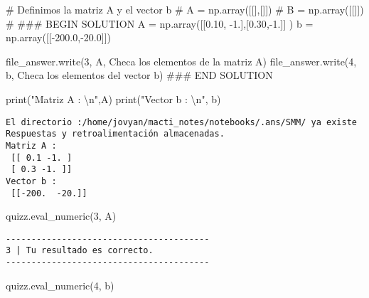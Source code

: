 \documentclass[
  letterpaper,
  DIV=11,
  numbers=noendperiod]{scrreprt}
\newenvironment{Shaded}{\begin{snugshade}}{\end{snugshade}}
\newcommand{\BuiltInTok}[1]{\textcolor[rgb]{0.00,0.23,0.31}{#1}}
\newcommand{\CharTok}[1]{\textcolor[rgb]{0.13,0.47,0.30}{#1}}
\newcommand{\CommentTok}[1]{\textcolor[rgb]{0.37,0.37,0.37}{#1}}
\newcommand{\FloatTok}[1]{\textcolor[rgb]{0.68,0.00,0.00}{#1}}
\newcommand{\NormalTok}[1]{\textcolor[rgb]{0.00,0.23,0.31}{#1}}
\newcommand{\OperatorTok}[1]{\textcolor[rgb]{0.37,0.37,0.37}{#1}}
\newcommand{\RegionMarkerTok}[1]{\textcolor[rgb]{0.00,0.23,0.31}{#1}}
\newcommand{\StringTok}[1]{\textcolor[rgb]{0.13,0.47,0.30}{#1}}
\begin{document}
\begin{Shaded}
\begin{Highlighting}[]
\CommentTok{\# Definimos la matriz A y el vector b}
\CommentTok{\# A = np.array([[],[]])}
\CommentTok{\# B = np.array([[]])}
\CommentTok{\#}
\CommentTok{\#\#\# }\RegionMarkerTok{BEGIN}\CommentTok{ SOLUTION}
\NormalTok{A }\OperatorTok{=}\NormalTok{ np.array([[}\FloatTok{0.10}\NormalTok{, }\OperatorTok{{-}}\FloatTok{1.}\NormalTok{],[}\FloatTok{0.30}\NormalTok{,}\OperatorTok{{-}}\FloatTok{1.}\NormalTok{]] )}
\NormalTok{b }\OperatorTok{=}\NormalTok{ np.array([[}\OperatorTok{{-}}\FloatTok{200.0}\NormalTok{,}\OperatorTok{{-}}\FloatTok{20.0}\NormalTok{]])}

\NormalTok{file\_answer.write(}\StringTok{\textquotesingle{}3\textquotesingle{}}\NormalTok{, A, }\StringTok{\textquotesingle{}Checa los elementos de la matriz A\textquotesingle{}}\NormalTok{)}
\NormalTok{file\_answer.write(}\StringTok{\textquotesingle{}4\textquotesingle{}}\NormalTok{, b, }\StringTok{\textquotesingle{}Checa los elementos del vector b\textquotesingle{}}\NormalTok{)}
\CommentTok{\#\#\# }\RegionMarkerTok{END}\CommentTok{ SOLUTION}

\BuiltInTok{print}\NormalTok{(}\StringTok{"Matriz A : }\CharTok{\textbackslash{}n}\StringTok{"}\NormalTok{,A)}
\BuiltInTok{print}\NormalTok{(}\StringTok{"Vector b : }\CharTok{\textbackslash{}n}\StringTok{"}\NormalTok{, b)}
\end{Highlighting}
\end{Shaded}

\begin{verbatim}
El directorio :/home/jovyan/macti_notes/notebooks/.ans/SMM/ ya existe
Respuestas y retroalimentación almacenadas.
Matriz A : 
 [[ 0.1 -1. ]
 [ 0.3 -1. ]]
Vector b : 
 [[-200.  -20.]]
\end{verbatim}

\begin{Shaded}
\begin{Highlighting}[]
\NormalTok{quizz.eval\_numeric(}\StringTok{\textquotesingle{}3\textquotesingle{}}\NormalTok{, A)}
\end{Highlighting}
\end{Shaded}

\begin{verbatim}
----------------------------------------
3 | Tu resultado es correcto.
----------------------------------------
\end{verbatim}

\begin{Shaded}
\begin{Highlighting}[]
\NormalTok{quizz.eval\_numeric(}\StringTok{\textquotesingle{}4\textquotesingle{}}\NormalTok{, b)}
\end{Highlighting}
\end{Shaded}
\end{document}
